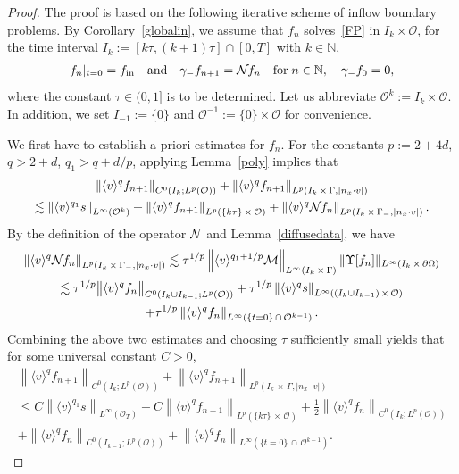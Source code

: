 \documentclass[10pt]{amsart}
\theoremstyle{definition}\newtheorem{defi}[theo]{Definition}\newtheorem{rema}[theo]{Remark}\newtheorem{exam}[theo]{Example}\newtheorem{exem}[theo]{Example}\newtheorem{nota}[theo]{Notation}
\newcommand*\p{\partial}
\newcommand*\fin {f_{\rm in}}
\newcommand*\N {\mathbb{N}}
\newcommand*\M {{\mathcal{M}}}
\newcommand*\NN {{\mathcal{N}\hspace{-.3mm}}}
\newcommand*\OO {\mathcal{O}}
\newcommand{\lv}{\langle v\rangle}
\begin{document}
\begin{proof}
The proof is based on the following iterative scheme of inflow boundary problems. By Corollary~\ref{globalin}, we assume that $f_n$ solves~\eqref{FP} in $I_k\times\OO$, for the time interval $I_k:=[k\tau,(k+1)\tau]\cap[0,T]$ with $k\in\N$,
\begin{align*}
f_n|_{t=0}=\fin\quad\text{and}\quad
\gamma_-f_{n+1}=\NN f_{n}\quad\text{for}\; n\in\N, \quad
\gamma_-f_0=0,
\end{align*}
where the constant $\tau\in(0,1]$ is to be determined. Let us abbreviate $\OO^k:=I_k\times\OO$. In addition, we set $I_{-1}:=\{0\}$ and $\OO^{-1}:=\{0\}\times\OO$ for convenience.

We first have to establish a priori estimates for $f_n$. For the constants $p:=2+4d$, $q>2+d$, $q_1>q+d/p$, applying Lemma~\ref{poly} implies that
\begin{multline*}
\left\|\lv^q f_{n+1}\right\|_{C^0\left(I_k;L^p(\OO)\right)} + \left\|\lv^q f_{n+1}\right\|_{L^p\left(I_k\,\times\,\Gamma,|n_x\cdot v|\right)}\\
\lesssim \left\|\lv^{q_1}s\right\|_{L^\infty\left(\OO^k\right)} + \left\|\lv^{q}f_{n+1}\right\|_{L^p(\{k\tau\}\,\times\,\OO)} + \left\|\lv^{q}\NN f_{n}\right\|_{L^p\left(I_k\,\times\,\Gamma_-,|n_x\cdot v|\right)}.
\end{multline*}
By the definition of the operator $\NN$ and Lemma~\ref{diffusedata}, we have
\begin{multline}\label{estb}
\left\|\lv^{q}\NN f_{n}\right\|_{L^p\left(I_k\,\times\,\Gamma_-,|n_x\cdot v|\right)}
\lesssim \tau^{1/p} \left\|\lv^{q_1+1/p}\M\right\|_{L^\infty\left(I_k\,\times\,\Gamma\right)} \|\Upsilon[f_{n}]\|_{L^\infty\left(I_k\,\times\,\p\Omega\right)}\\
\lesssim \tau^{1/p} \big\|\lv^{q} f_{n}\big\|_{C^0\left(I_k\cup I_{k-1};L^p(\OO)\right)} + \tau^{1/p} \left\|\lv^{q}s\right\|_{L^\infty\left(\left(I_k\cup I_{k-1}\right)\,\times\,\OO\right)}\\
+ \tau^{1/p} \left\|\lv^{q}f_{n}\right\|_{L^\infty\left(\{t=0\}\,\cap\,\OO^{k-1}\right)}.
\end{multline}
Combining the above two estimates and choosing $\tau$ sufficiently small yields that for some universal constant $C>0$,
\begin{multline}\label{estinb}
\left\|\lv^q f_{n+1}\right\|_{C^0\left(I_k;L^p(\OO)\right)} + \left\|\lv^q f_{n+1}\right\|_{L^p\left(I_k\,\times\,\Gamma,|n_x\cdot v|\right)} \\
\le C\left\|\lv^{q_1}s\right\|_{L^\infty(\OO_T)} + C
\left\|\lv^{q}f_{n+1}\right\|_{L^p\left(\{k\tau\}\,\times\,\OO\right)} + \frac{1}{2}\left\|\lv^{q} f_{n}\right\|_{C^0\left(I_k;L^p(\OO)\right)}\\
+ \left\|\lv^{q} f_{n}\right\|_{C^0\left(I_{k-1};L^p(\OO)\right)} + \left\|\lv^qf_{n}\right\|_{L^\infty\left(\{t=0\}\,\cap\,\OO^{k-1}\right)}.
\end{multline}


\end{proof}
\end{document}
